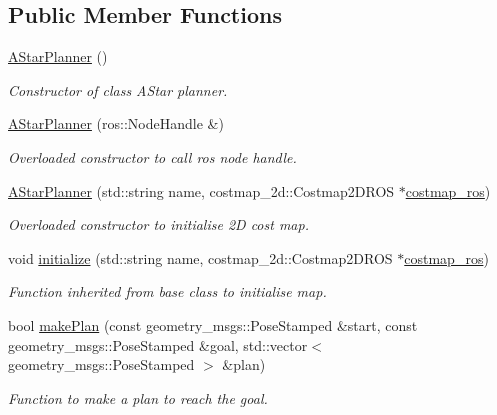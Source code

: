 \subsection*{Public Member Functions}
\begin{DoxyCompactItemize}
\item 
\hyperlink{classastar__plugin_1_1_a_star_planner_a709090708527da7d103f7c9373f4b651}{A\+Star\+Planner} ()
\begin{DoxyCompactList}\small\item\em Constructor of class A\+Star planner. \end{DoxyCompactList}\item 
\hyperlink{classastar__plugin_1_1_a_star_planner_a79cd3d4231e807ccc04f70d1e4ecd837}{A\+Star\+Planner} (ros\+::\+Node\+Handle \&)
\begin{DoxyCompactList}\small\item\em Overloaded constructor to call ros node handle. \end{DoxyCompactList}\item 
\hyperlink{classastar__plugin_1_1_a_star_planner_a6eaf79c8595c501e03117436fd499e42}{A\+Star\+Planner} (std\+::string name, costmap\+\_\+2d\+::\+Costmap2\+D\+R\+OS $\ast$\hyperlink{classastar__plugin_1_1_a_star_planner_a1be22c40d97241edb0a60b7bd3c332f3}{costmap\+\_\+ros})
\begin{DoxyCompactList}\small\item\em Overloaded constructor to initialise 2D cost map. \end{DoxyCompactList}\item 
void \hyperlink{classastar__plugin_1_1_a_star_planner_abd555da48b7cb20f1fef16962ac0a71c}{initialize} (std\+::string name, costmap\+\_\+2d\+::\+Costmap2\+D\+R\+OS $\ast$\hyperlink{classastar__plugin_1_1_a_star_planner_a1be22c40d97241edb0a60b7bd3c332f3}{costmap\+\_\+ros})
\begin{DoxyCompactList}\small\item\em Function inherited from base class to initialise map. \end{DoxyCompactList}\item 
bool \hyperlink{classastar__plugin_1_1_a_star_planner_a0452b64fca4b454fad7da2249494a9fd}{make\+Plan} (const geometry\+\_\+msgs\+::\+Pose\+Stamped \&start, const geometry\+\_\+msgs\+::\+Pose\+Stamped \&goal, std\+::vector$<$ geometry\+\_\+msgs\+::\+Pose\+Stamped $>$ \&plan)
\begin{DoxyCompactList}\small\item\em Function to make a plan to reach the goal. \end{DoxyCompactList}\item 

\end{DoxyCompactItemize}

